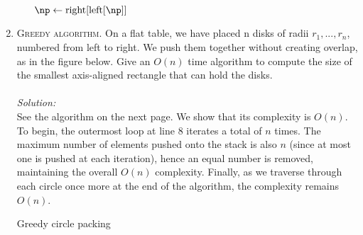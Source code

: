 \documentclass[12pt]{article}
\theoremstyle{definition}
\theoremstyle{remark}
\newcommand\sol{%
  \\ 
  \\
  \textit{Solution:}\\%
}
\begin{document}
\begin{enumerate}
\begin{enumerate}
\begin{algorithm}
    \BlankLine
    $\np \gets \text{right}[\text{left}[\np]]$ 
    
    
    
\end{algorithm}
\end{enumerate}
  \newpage 
  \item \textsc{Greedy algorithm}. On a flat table, we have placed n disks of radii $r_1, ..., r_n$, numbered from left to right. We push them together without creating overlap, as in the figure below. Give an $O(n)$ time algorithm to compute the size of the smallest axis-aligned rectangle that can hold the disks.
  \sol 
  See the algorithm on the next page. We show that its complexity is $O(n)$. To begin, the outermost loop at line 8 iterates a total of $n$ times. The maximum number of elements pushed onto the stack is also $n$ (since at most one is pushed at each iteration), hence an equal number is removed, maintaining the overall $O(n)$ complexity. Finally, as we traverse through each circle once more at the end of the algorithm, the complexity remains $O(n)$.
  \begin{algorithm}
    \caption{Greedy circle packing}


\end{algorithm}
\end{enumerate}
\end{document}
